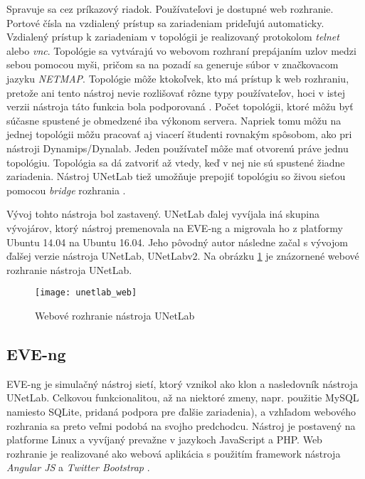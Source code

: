 Spravuje sa cez príkazový riadok. Používateľovi je dostupné web rozhranie. Portové čísla na vzdialený prístup sa zariadeniam prideľujú automaticky. Vzdialený prístup k zariadeniam v topológii je realizovaný protokolom \emph{telnet} alebo \emph{vnc}. Topológie sa vytvárajú vo webovom rozhraní prepájaním uzlov medzi sebou pomocou myši, pričom sa na pozadí sa generuje súbor v značkovacom jazyku \emph{NETMAP}. Topológie môže ktokoľvek, kto má prístup k web rozhraniu, pretože ani tento nástroj nevie rozlišovať rôzne typy používateľov, hoci v istej verzii nástroja táto funkcia bola podporovaná \cite{unetlab_github}. Počet topológii, ktoré môžu byť súčasne spustené je obmedzené iba výkonom servera. Napriek tomu môžu na jednej topológii môžu pracovať aj viacerí študenti rovnakým spôsobom, ako pri nástroji Dynamips/Dynalab. Jeden používateľ môže mať otvorenú práve jednu topológiu. Topológia sa dá zatvoriť až vtedy, keď v nej nie sú spustené žiadne zariadenia. Nástroj UNetLab tiež umožňuje prepojiť topológiu so živou sieťou pomocou \emph{bridge} rozhrania \cite{webiou_real_network}.

Vývoj tohto nástroja bol zastavený. UNetLab ďalej vyvíjala iná skupina vývojárov, ktorý nástroj premenovala na EVE-ng a migrovala ho z platformy Ubuntu 14.04 na Ubuntu 16.04. Jeho pôvodný autor následne začal s vývojom ďalšej verzie nástroja UNetLab, UNetLabv2. Na obrázku \ref{obr:unetlab_web} je znázornené webové rozhranie nástroja UNetLab.

\begin{figure}
    \centering
    \texttt{[image: unetlab\_web]}
    \caption{Webové rozhranie nástroja UNetLab}
    \cite{obr_unetlab_web}
    \label{obr:unetlab_web}
\end{figure}

\subsection{EVE-ng}
\label{chap:virt_lab_eve_ng}

EVE-ng je simulačný nástroj sietí, ktorý vznikol ako klon a nasledovník nástroja UNetLab. Celkovou funkcionalitou, až na niektoré zmeny, napr. použitie MySQL namiesto SQLite, pridaná podpora pre ďalšie zariadenia), a vzhľadom webového rozhrania sa preto veľmi podobá na svojho predchodcu. Nástroj je postavený na platforme Linux a vyvíjaný prevažne v jazykoch JavaScript a PHP. Web rozhranie je realizované ako webová aplikácia s použitím framework nástroja \emph{Angular JS} a \emph{Twitter Bootstrap} \cite{eve_ng_technologies}.

